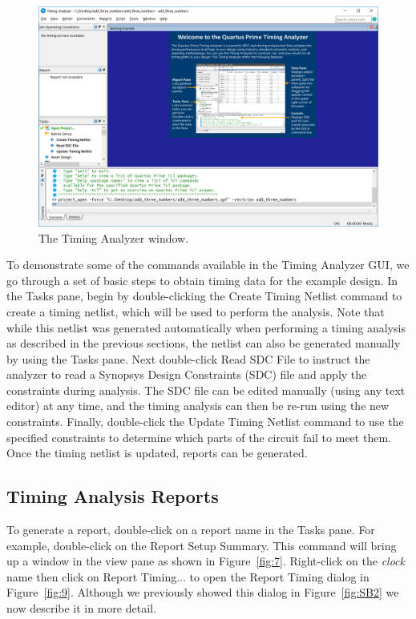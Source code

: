 \documentclass[11pt, twoside, pdftex]{article}
\begin{document}
\begin{figure}[H]
\begin{center}
\includegraphics[scale=0.5]{figures/figure5.png}
\end{center}
\caption{The Timing Analyzer window.}
\label{fig:5}
\end{figure}

To demonstrate some of the commands available in the Timing Analyzer GUI, we go through a set of basic 
steps to obtain timing data for the example design. In the Tasks pane, begin by double-clicking
the {\sf Create Timing Netlist} command to create a timing netlist, which will be used to perform 
the analysis. Note that while this netlist was generated automatically when performing a timing 
analysis as described in the previous sections, the netlist can also be generated manually 
by using the Tasks pane. Next double-click {\sf Read SDC File} to instruct the analyzer to 
read a Synopsys Design Constraints (SDC) file and apply the constraints during analysis.
The SDC file can be edited manually (using any text editor) at any time, and the timing
analysis can then be re-run using the new constraints. 
Finally, double-click the {\sf Update Timing Netlist} command to use the specified 
constraints to determine which parts of the circuit fail 
to meet them. Once the timing netlist is updated, reports can be generated.

\subsection{Timing Analysis Reports}

To generate a report, double-click on a report name in the Tasks pane. 
For example, double-click on the {\sf Report Setup Summary}. This command
will bring up a window in the view pane as shown in Figure~\ref{fig:7}. Right-click on the
{\it clock} name then click on {\sf Report Timing...} to open the Report Timing dialog in Figure~\ref{fig:9}. Although we previously 
showed this dialog in Figure~\ref{fig:SB2} we now describe it in more detail. 
\end{document}
